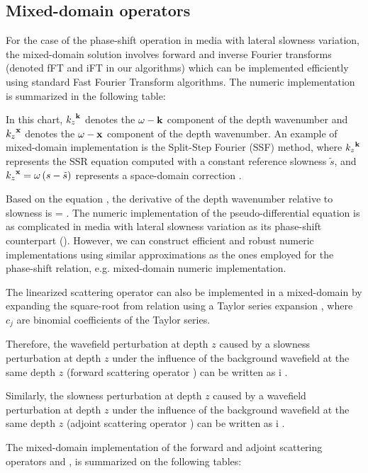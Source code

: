 \subsection{Mixed-domain operators}

For the case of the phase-shift operation in media with lateral
slowness variation, the mixed-domain solution involves forward and
inverse Fourier transforms (denoted fFT and iFT in our algorithms)
which can be implemented efficiently using standard Fast Fourier
Transform algorithms. The numeric implementation is summarized in the
following table:
\psop

In this chart, ${{k_z}^{{\bf k}}}$ denotes the $\omega-{\bf k}$ component of the depth
wavenumber and ${{k_z}^{{\bf x}}}$ denotes the $\omega-{\bf x}$ component of the depth
wavenumber. An example of mixed-domain implementation is the
Split-Step Fourier (SSF) method, where ${{k_z}^{{\bf k}}}$ represents the SSR
equation computed with a constant reference slowness $\tilde{s}$, and
${{k_z}^{{\bf x}}}=\omega\left ( s-\tilde{s} \right)$ represents a space-domain correction
\cite[]{GEO55-04-04100421}.

Based on the equation , the derivative of the depth
wavenumber relative to slowness is
%
\beq \label{eqn:DKZDS-sroot}
\dkzds = \frac{\ww}{\SSX{\ws_0\ofm}{\km}} \;.
\eeq
%
The numeric implementation of the pseudo-differential equation
 is as complicated in media with lateral slowness
variation as its phase-shift counterpart (). However, we
can construct efficient and robust numeric implementations using
similar approximations as the ones employed for the phase-shift
relation, e.g. mixed-domain numeric implementation.

The linearized scattering operator can also be implemented in a
mixed-domain by expanding the square-root from relation
 using a Taylor series expansion
%
\beq \label{eqn:DKZDS-taylor}
\dkzds \approx \ww \lp \SST{\ws_0\ofm}{\km} \rp \;,
\eeq
%
where $c_j$ are binomial coefficients of the Taylor series.

Therefore, the wavefield perturbation at depth $z$ caused by a
slowness perturbation at depth $z$ under the influence of the
background wavefield at the same depth $z$ (forward scattering
operator ) can be written as
\beq \label{eqn:FSOPnumeric}
\dUU\ofm \approx \pm i\ww\dz \lp \SST{\ws_0\ofm}{\km} \rp \UU\ofm \ds\ofm \;.
\eeq

Similarly, the slowness perturbation at depth $z$ caused by a
wavefield perturbation at depth $z$ under the influence of the
background wavefield at the same depth $z$ (adjoint scattering
operator ) can be written as
\bea \label{eqn:ASOPnumeric}
\ds\ofm \approx \mp i\ww\dz \lp \SST{\ws_0\ofm}{\km} \rp \CONJ{\UU\ofm} \dUU\ofm \;.
\eea

The mixed-domain implementation of the forward and adjoint scattering
operators  and , is summarized on
the following tables:
\vfill \scop \vfill \acop \vfill

